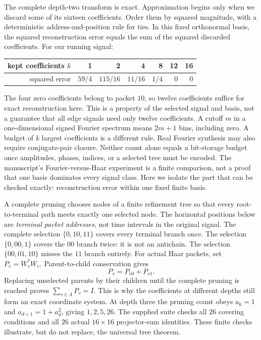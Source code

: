 The complete depth-two transform is exact. Approximation begins only when we discard some of its sixteen coefficients. Order them by squared magnitude, with a deterministic address-and-position rule for ties.
In this fixed orthonormal basis, the squared reconstruction error equals the sum of the squared discarded coefficients. For our running signal:
\begin{center}
\begin{tabular}{r|rrrrrr}
kept coefficients $k$ & 1&2&4&8&12&16\\\hline
squared error & $59/4$&$115/16$&$11/16$&$1/4$&$0$&$0$
\end{tabular}
\end{center}
The four zero coefficients belong to packet $10$, so twelve coefficients suffice for exact reconstruction here. This is a property of the selected signal and basis, not a guarantee that all edge signals need only twelve coefficients.
A cutoff $m$ in a one-dimensional signed Fourier spectrum means $2m+1$ bins, including zero. A budget of $k$ largest coefficients is a different rule. Real Fourier synthesis may also require conjugate-pair closure. Neither count alone equals a bit-storage budget once amplitudes, phases, indices, or a selected tree must be encoded.
The manuscript's Fourier-versus-Haar experiment is a finite comparison, not a proof that one basis dominates every signal class. Here we isolate the part that can be checked exactly: reconstruction error within one fixed finite basis.

A complete pruning chooses nodes of a finite refinement tree so that every root-to-terminal path meets exactly one selected node. The horizontal positions below are \emph{terminal packet addresses}, not time intervals in the original signal.
The complete selection $\{0,10,11\}$ covers every terminal branch once. The selection $\{0,00,1\}$ covers the $00$ branch twice: it is not an antichain. The selection $\{00,01,10\}$ misses the $11$ branch entirely.
For actual Haar packets, set $P_v=W_v^*W_v$. Parent-to-child conservation gives
\[
P_v=P_{v0}+P_{v1}.
\]
Replacing unselected parents by their children until the complete pruning is reached proves $\sum_{v\in\Lambda}P_v=I$. This is why the coefficients at different depths still form an exact coordinate system.
At depth three the pruning count obeys $a_0=1$ and $a_{d+1}=1+a_d^2$, giving $1,2,5,26$. The supplied suite checks all $26$ covering conditions and all $26$ actual $16\times16$ projector-sum identities. These finite checks illustrate, but do not replace, the universal tree theorem.

